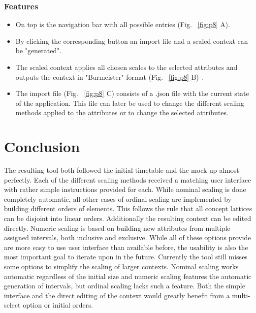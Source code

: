 \documentclass[]{report}
\begin{document}
\subsection{Features}
\begin{itemize}
	\item On top is the navigation bar with all possible entries (Fig. ~\ref{fig:p8} A). 
    \item By clicking the corresponding button an import file and a scaled context can be "generated".
    \item The scaled context applies all chosen scales to the selected attributes and outputs the context in "Burmeister"-format (Fig. ~\ref{fig:p8} B) .
    \item The import file (Fig. ~\ref{fig:p8} C) consists of a .json file with the current state of the application. This file can later be used to change the different scaling methods applied to the attributes or to change the selected attributes.
\end{itemize}

\chapter{Conclusion}
The resulting tool both followed the initial timetable and the mock-up almost perfectly. Each of the different scaling methods received a matching user interface with rather simple instructions provided for each. While nominal scaling is done completely automatic, all other cases of ordinal scaling are implemented by building different orders of elements. This follows the rule that all concept lattices can be disjoint into linear orders. Additionally the resulting context can be edited directly. Numeric scaling is based on building new attributes from multiple assigned intervals, both inclusive and exclusive. While all of these options provide are more easy to use user interface than available before, the usability is also the most important goal to iterate upon in the future. Currently the tool still misses some options to simplify the scaling of larger contexts. Nominal scaling works automatic regardless of the initial size and numeric scaling features the automatic generation of intervals, but ordinal scaling lacks such a feature. Both the simple interface and the direct editing of the context would greatly benefit from a multi-select option or initial orders.
\end{document}
